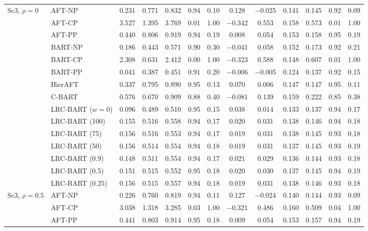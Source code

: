 \documentclass[11pt]{article}
\theoremstyle{definition}
\theoremstyle{plain}
\begin{document}
\begin{center}
\begin{longtable}{llccccccccccc}
\midrule
\multirow{15}{*}{Sc3, $\rho=0$} & AFT-NP & 0.231 & 0.771 & 0.832 & 0.94 & 0.10 & 0.128 & $-$0.025 & 0.141 & 0.145 & 0.92 & 0.09 \\
& AFT-CP & 3.527 & 1.395 & 3.769 & 0.01 & 1.00 & $-$0.342 & 0.553 & 0.158 & 0.573 & 0.01 & 1.00 \\
& AFT-PP & 0.440 & 0.806 & 0.919 & 0.94 & 0.19 & 0.008 & 0.054 & 0.153 & 0.158 & 0.95 & 0.19 \\
& BART-NP & 0.186 & 0.443 & 0.571 & 0.90 & 0.30 & $-$0.041 & 0.058 & 0.152 & 0.173 & 0.92 & 0.21 \\
& BART-CP & 2.308 & 0.631 & 2.412 & 0.00 & 1.00 & $-$0.323 & 0.588 & 0.148 & 0.607 & 0.01 & 1.00 \\
& BART-PP & 0.041 & 0.387 & 0.451 & 0.91 & 0.20 & $-$0.006 & $-$0.005 & 0.124 & 0.137 & 0.92 & 0.15 \\
& HierAFT & 0.337 & 0.795 & 0.890 & 0.95 & 0.13 & 0.070 & 0.006 & 0.147 & 0.147 & 0.95 & 0.11 \\
& C-BART & 0.576 & 0.670 & 0.909 & 0.88 & 0.40 & $-$0.081 & 0.139 & 0.159 & 0.222 & 0.85 & 0.38 \\
& LRC-BART ($w=0$) & 0.096 & 0.489 & 0.510 & 0.95 & 0.15 & 0.038 & 0.014 & 0.133 & 0.137 & 0.94 & 0.17 \\
& LRC-BART (100) & 0.155 & 0.516 & 0.558 & 0.94 & 0.17 & 0.020 & 0.031 & 0.138 & 0.146 & 0.94 & 0.18 \\
& LRC-BART (75) & 0.156 & 0.516 & 0.553 & 0.94 & 0.17 & 0.019 & 0.031 & 0.138 & 0.145 & 0.93 & 0.18 \\
& LRC-BART (50) & 0.156 & 0.514 & 0.554 & 0.94 & 0.18 & 0.019 & 0.031 & 0.137 & 0.145 & 0.93 & 0.19 \\
& LRC-BART (0.9) & 0.148 & 0.511 & 0.554 & 0.94 & 0.17 & 0.021 & 0.029 & 0.136 & 0.144 & 0.93 & 0.18 \\
& LRC-BART (0.5) & 0.151 & 0.515 & 0.552 & 0.95 & 0.18 & 0.020 & 0.030 & 0.137 & 0.145 & 0.94 & 0.19 \\
& LRC-BART (0.25) & 0.156 & 0.515 & 0.557 & 0.94 & 0.18 & 0.019 & 0.031 & 0.138 & 0.146 & 0.93 & 0.18 \\
\midrule
\multirow{15}{*}{Sc3, $\rho=0.5$} & AFT-NP & 0.226 & 0.760 & 0.819 & 0.94 & 0.11 & 0.127 & $-$0.024 & 0.140 & 0.144 & 0.93 & 0.09 \\
& AFT-CP & 3.038 & 1.318 & 3.285 & 0.03 & 1.00 & $-$0.321 & 0.486 & 0.160 & 0.509 & 0.04 & 1.00 \\
& AFT-PP & 0.441 & 0.803 & 0.914 & 0.95 & 0.18 & 0.009 & 0.054 & 0.153 & 0.157 & 0.94 & 0.19 \\

\end{longtable}
\end{center}
\end{document}
